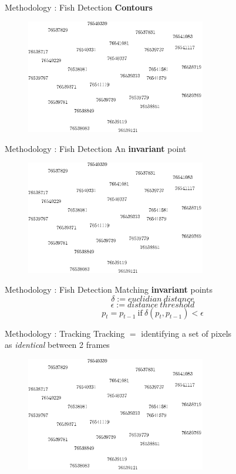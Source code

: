 \documentclass{beamer}
\begin{document}
\begin{frame}[c]{Methodology : Fish Detection}
\center \textbf{Contours} \\
\begin{figure}[hbtp]
\centering
\includegraphics[width=0.7\textwidth]{fig/number/cloud}
\end{figure}
\end{frame}

\begin{frame}[c]{Methodology : Fish Detection}
\center An \textbf{invariant} point \\
\begin{figure}[hbtp]
\centering
\includegraphics[width=0.7\textwidth]{fig/number/cloud}
\end{figure}
\end{frame}


\begin{frame}[c]{Methodology : Fish Detection}
\center Matching \textbf{invariant} points \\

$$
\delta := euclidian\ distance
$$
$$
\epsilon := distance\ threshold
$$
$$
p_t = p_{t-1}\ \text{if}\ \delta(p_t, p_{t-1}) < \epsilon
$$

\end{frame}


\begin{frame}[c]{Methodology : Tracking}
\center Tracking $=$ identifying a set of pixels \\as \textit{identical} between 2 frames\\
\begin{figure}[hbtp]
\centering
\includegraphics[width=0.7\textwidth]{fig/number/cloud}
\end{figure}
\end{frame}
\end{document}
